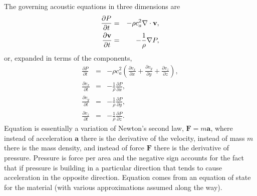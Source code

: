 The governing acoustic equations in three dimensions are
\begin{eqnarray}
  \frac{\partial P}{\partial t} & = & -\rho c_a^2 \nabla\cdot\mathbf{v},
  \label{eq:pGoverning}
  \\
  \frac{\partial \mathbf{v}}{\partial t} & = & -\frac{1}{\rho} \nabla P,
  \label{eq:vGoverning}
\end{eqnarray}
or, expanded in terms of the components,
\begin{eqnarray}
\frac{\partial P}{\partial t} & = & -\rho c_a^2
     \left(\frac{\partial v_x}{\partial x} +
           \frac{\partial v_y}{\partial y} +
           \frac{\partial v_z}{\partial z}\right) \label{eq:p-gov},\\
\frac{\partial v_x}{\partial t}
   & = & -\frac{1}{\rho} \frac{\partial P}{\partial x} \label{eq:vx-gov},\\
\frac{\partial v_y}{\partial t}
   & = & -\frac{1}{\rho} \frac{\partial P}{\partial y} \label{eq:vy-gov},\\
\frac{\partial v_z}{\partial t}
   & = & -\frac{1}{\rho} \frac{\partial P}{\partial z} \label{eq:vz-gov}.
\end{eqnarray}
Equation  is essentially a variation of Newton's
second law, $\mathbf{F}=m\mathbf{a}$, where instead of acceleration
$\mathbf{a}$ there is the derivative of the velocity, instead of mass
$m$ there is the mass density, and instead of force $\mathbf{F}$ there
is the derivative of pressure.  Pressure is force per area and the
negative sign accounts for the fact that if pressure is building in a
particular direction that tends to cause acceleration in the opposite
direction.  Equation  comes from an equation of
state for the material (with various approximations assumed along the
way).


